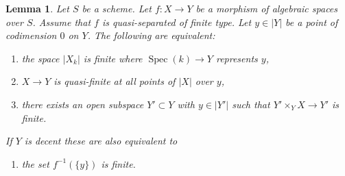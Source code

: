 \documentclass{stacks-project}
\theoremstyle{plain}
\newtheorem{lemma}[subsection]{Lemma}
\theoremstyle{definition}
\theoremstyle{remark}
\numberwithin{equation}{subsection}
\def\Spec{\mathop{\mathrm{Spec}}}
\begin{document}
\begin{lemma}
\label{lemma-generically-finite}
Let $S$ be a scheme. Let $f : X \to Y$ be a morphism of algebraic spaces
over $S$. Assume that $f$ is quasi-separated of finite type.
Let $y \in |Y|$ be a point of codimension $0$ on $Y$.
The following are equivalent:
\begin{enumerate}
\item the space $|X_k|$ is finite where $\Spec(k) \to Y$ represents $y$,
\item $X \to Y$ is quasi-finite at all points of $|X|$ over $y$,
\item there exists an open subspace $Y' \subset Y$ with $y \in |Y'|$
such that $Y' \times_Y X \to Y'$ is finite.
\end{enumerate}
If $Y$ is decent these are also equivalent to
\begin{enumerate}
\item[(4)] the set $f^{-1}(\{y\})$ is finite.
\end{enumerate}
\end{lemma}
\end{document}
